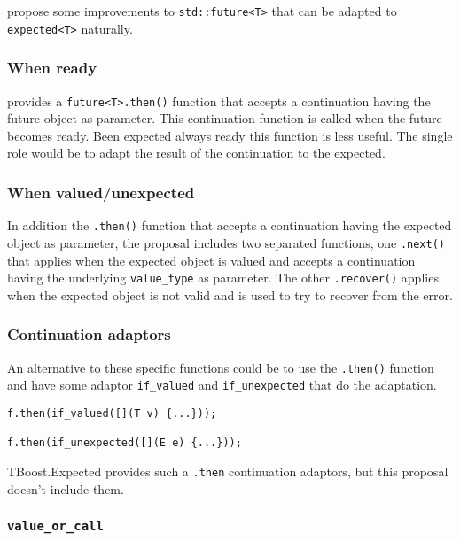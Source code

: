 \documentclass[a4paper,10pt]{article}
\newcommand{\cpp}[1]{\lstinline{#1}}
\begin{document}
\cite{ImprovementsAsync} propose some improvements to \cpp{std::future<T>} that can be adapted to \cpp{expected<T>} naturally.

\subsubsection{When ready}

\cite{ImprovementsAsync} provides a \cpp{future<T>.then()} function that accepts a continuation having the future object as parameter. This continuation function is called when the future becomes ready. Been expected always ready this function is less useful. The single role would be to adapt the result of the continuation to the expected.

\subsubsection{When valued/unexpected}

In addition the \cpp{.then()} function that accepts a continuation having the expected object as parameter, the proposal includes two separated functions, one \cpp{.next()} that applies when the expected object is valued and accepts a continuation having the underlying \cpp{value_type} as parameter. The other \cpp{.recover()} applies when the expected object is not valid and is used to try to recover from the error.  

\subsubsection{Continuation adaptors}

An alternative to these specific functions could be to use the \cpp{.then()} function and have some adaptor \cpp{if_valued} and \cpp{if_unexpected} that do the adaptation.

\begin{lstlisting}
f.then(if_valued([](T v) {...}));

f.then(if_unexpected([](E e) {...}));
\end{lstlisting}

TBoost.Expected \cite{boost_expected} provides such a \cpp{.then} continuation adaptors, but this proposal doesn't include them.

\subsubsection{\cpp{value_or_call}}
\end{document}
